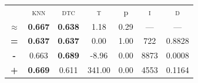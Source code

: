 \begin{tabular}{c||cc||c|c|c||c}
\midrule	&\textsc{knn} & \textsc{dtc} & \textsc{t} & p & \textsc{i} & \textsc{d}\\
	\color{black} $\approx$ & \color{black} \bfseries 0.667 &\color{black}  \bfseries 0.638 & 1.18 & 0.29 & --- & ---\\\midrule
	{\bfseries\color{black}\tiny=}& \color{black} \bfseries 0.637 & \color{black} \bfseries 0.637 & 0.00 & 1.00 & 722 & \color{black} 0.8828\\
	{\bfseries\color{blue}\tiny-}& \color{blue}  0.663 & \color{blue} \bfseries 0.689 & -8.96 & 0.00 & 8873 & \color{blue} 0.0008\\
	{\bfseries\color{red}\tiny+}& \color{red} \bfseries 0.669 & \color{red}  0.611 & 341.00 & 0.00 & 4553 & \color{red} 0.1164\\
\bottomrule\end{tabular}


